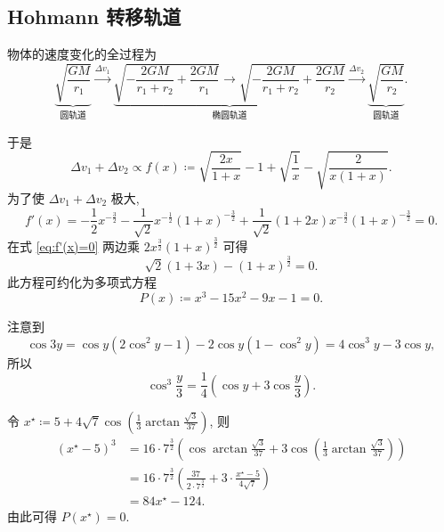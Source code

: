 \documentclass{article}
\begin{document}
\subsection{Hohmann 转移轨道}

物体的速度变化的全过程为
\begin{equation}
	\underbrace{\sqrt{\frac{GM}{r_1}}}_{\text{圆轨道}}\xrightarrow{\Delta v_1}
	\underbrace{\sqrt{-\frac{2GM}{r_1+r_2}+\frac{2GM}{r_1}}
	\rightarrow\sqrt{-\frac{2GM}{r_1+r_2}+\frac{2GM}{r_2}}}_{\text{椭圆轨道}}
	\xrightarrow{\Delta v_2}\underbrace{\sqrt{\frac{GM}{r_2}}}_{\text{圆轨道}}.
\end{equation}

于是
\begin{equation}
	\Delta v_1+\Delta v_2\propto f\!\left(x\right)\coloneqq 
	\sqrt{\frac{2x}{1+x}}-1+\sqrt{\frac1x}-\sqrt{\frac2{x\left(1+x\right)}}.
\end{equation}
为了使 $\Delta v_1+\Delta v_2$ 极大,
\begin{equation}
	f'\!\left(x\right)=-\frac12x^{-\frac32}-\frac1{\sqrt2}x^{-\frac12}\left(1+x\right)^{-\frac32}
	+\frac1{\sqrt2}\left(1+2x\right)x^{-\frac32}\left(1+x\right)^{-\frac32}=0.
	\label{eq:f'(x)=0}
\end{equation}
在式 \ref{eq:f'(x)=0} 两边乘 $2x^{\frac32}\left(1+x\right)^{\frac32}$ 可得
\begin{equation}
	\sqrt2\left(1+3x\right)-\left(1+x\right)^{\frac32}=0.
\end{equation}
此方程可约化为多项式方程
\begin{equation}
	P\!\left(x\right)\coloneqq x^3-15x^2-9x-1=0.
\end{equation}

注意到
\begin{equation*}
	\cos3y=\cos y\left(2\cos^2y-1\right)-2\cos y\left(1-\cos^2y\right)=4\cos^3y-3\cos y,
\end{equation*}
所以
\begin{equation*}
	\cos^3\frac y3=\frac14\left(\cos y+3\cos\frac y3\right).
\end{equation*}

令 $x^\star\coloneqq 5+4\sqrt7\cos\!\left(\frac13\arctan\frac{\sqrt3}{37}\right)$, 则
\begin{align}
	\left(x^\star-5\right)^3&=16\cdot 7^{\frac 32}\left(\cos\arctan\frac{\sqrt3}{37}+3\cos\!\left(\frac13\arctan\frac{\sqrt3}{37}\right)\right)\\
	&=16\cdot 7^{\frac 32}\left(\frac{37}{2\cdot 7^{\frac32}}+3\cdot\frac{x^\star-5}{4\sqrt7}\right)\\
	&=84x^\star-124.
\end{align}
由此可得 $P\!\left(x^\star\right)=0$.
\end{document}
